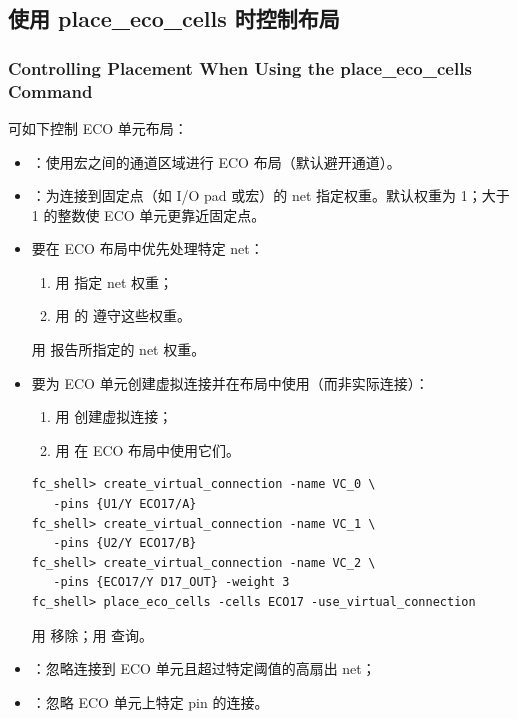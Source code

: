 \subsection{使用 place\_eco\_cells 时控制布局}
\subsubsection*{Controlling Placement When Using the place\_eco\_cells Command}

可如下控制 ECO 单元布局：
\begin{itemize}
  \item {}：使用宏之间的通道区域进行 ECO 布局（默认避开通道）。
  \item {}：为连接到固定点（如 I/O pad 或宏）的 net 指定权重。默认权重为 1；大于 1 的整数使 ECO 单元更靠近固定点。
  \item 要在 ECO 布局中优先处理特定 net：
  \begin{enumerate}
    \item 用  指定 net 权重；
    \item 用  的  遵守这些权重。
  \end{enumerate}
  用  报告所指定的 net 权重。
  \item 要为 ECO 单元创建虚拟连接并在布局中使用（而非实际连接）：
  \begin{enumerate}
    \item 用  创建虚拟连接；
    \item 用  在 ECO 布局中使用它们。
  \end{enumerate}
\begin{lstlisting}
fc_shell> create_virtual_connection -name VC_0 \
   -pins {U1/Y ECO17/A}
fc_shell> create_virtual_connection -name VC_1 \
   -pins {U2/Y ECO17/B}
fc_shell> create_virtual_connection -name VC_2 \
   -pins {ECO17/Y D17_OUT} -weight 3
fc_shell> place_eco_cells -cells ECO17 -use_virtual_connection
\end{lstlisting}
  用  移除；用  查询。
  \item \opt{-max\_fanout}：忽略连接到 ECO 单元且超过特定阈值的高扇出 net；
  \item {}：忽略 ECO 单元上特定 pin 的连接。
\end{itemize}

